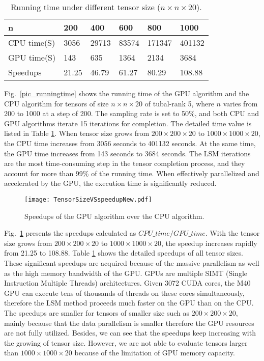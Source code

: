 \documentclass[format=acmsmall, review=false, screen=true]{acmart}
\begin{document}
\begin{table}[t]
  \renewcommand{\arraystretch}{1.3}
  \centering
  \scriptsize
  \caption{Running time under different tensor size ($n \times n \times 20$).}
  \begin{tabular}{|l|l|l|l|l|l|}
    \hline
    \textbf{\textbf{n}} & \textbf{200}& \textbf{400}& \textbf{600} & \textbf{800} & \textbf{1000}\\
    \hline
    CPU time(S) & 3056 & 29713 & 83574 & 171347 & 401132\\
    \hline
    GPU time(S) & 143 & 635 & 1364 & 2134 & 3684\\
    \hline
    Speedups & 21.25 & 46.79 & 61.27 & 80.29 & 108.88\\
    \hline
  \end{tabular}
  \label{tbl_runtime}
\end{table}

Fig.~\ref{pic_runningtime} shows the running time of the GPU algorithm and the CPU algorithm for tensors of size $n \times n \times 20$ of tubal-rank 5, where $n$ varies from 200 to 1000 at a step of 200. The sampling rate is set to 50\%, and both CPU and GPU algorithms iterate 15 iterations for completion. The detailed time value is listed in Table \ref{tbl_runtime}. When tensor size grows from $200 \times 200 \times 20$ to $1000 \times 1000 \times 20$,  the CPU time increases from 3056 seconds to 401132 seconds. At the same time, the GPU time increases from 143 seconds to 3684 seconds. The LSM iterations are the most time-consuming step in the tensor completion process, and they account for more than 99\% of the running time. When effectively parallelized and accelerated by the GPU, the execution time is significantly reduced.

\begin{figure}[t]
    \centering
    \texttt{[image: TensorSizeVSspeedupNew.pdf]}
    \caption{Speedups of the GPU algorithm over the CPU algorithm.}
    \label{pic_speedup}
\end{figure}

Fig.~\ref{pic_speedup} presents the speedups calculated as $CPU\_time / GPU\_time$. With the tensor size grows from $200 \times 200 \times 20$ to $1000 \times 1000 \times 20$, the speedup increases rapidly from 21.25 to 108.88. Table \ref{tbl_runtime} shows the detailed speedups of all tensor sizes. These significant speedups are acquired because of the massive parallelism as well as the high memory bandwidth of the GPU. GPUs are multiple SIMT (Single Instruction Multiple Threads) architectures. Given 3072 CUDA cores, the M40 GPU can execute tens of thousands of threads on these cores simultaneously, therefore the LSM method proceeds much faster on the GPU than on the CPU. The speedups are smaller for tensors of smaller size such as $200 \times 200 \times 20$, mainly because that the data parallelism is smaller therefore the GPU resources are not fully utilized. Besides, we can see that the speedups keep increasing with the growing of tensor size. However, we are not able to evaluate tensors larger than $1000 \times 1000 \times 20$ because of the limitation of GPU memory capacity.
\end{document}
